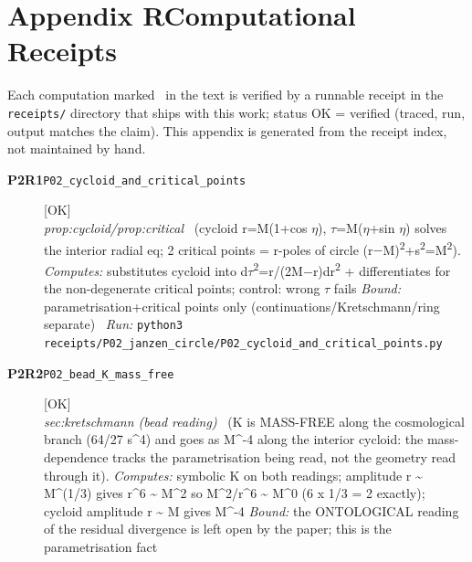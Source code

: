 \clearpage
\section*{Appendix R\quad Computational Receipts}\label{app:receipts}
\small\noindent Each computation marked \rcptmarker\ in the text is verified by a runnable receipt in the \texttt{receipts/} directory that ships with this work; status \textsf{OK} = verified (traced, run, output matches the claim). This appendix is generated from the receipt index, not maintained by hand.\par\medskip
\begingroup\renewcommand{\arraystretch}{1.25}
\begin{description}
\item[\textbf{P2R1}\quad\texttt{P02\_cycloid\_and\_critical\_points}]\hfill\textsf{[OK]}\\
\textit{prop:cycloid/prop:critical} \ (cycloid r=M(1+cos \ensuremath{\eta}), \ensuremath{\tau}=M(\ensuremath{\eta}+sin \ensuremath{\eta}) solves the interior radial eq; 2 critical points = r-poles of circle (r\ensuremath{-}M)\textsuperscript{2}+s\textsuperscript{2}=M\textsuperscript{2}). 
\emph{Computes:} substitutes cycloid into d\ensuremath{\tau}\textsuperscript{2}=r/(2M\ensuremath{-}r)dr\textsuperscript{2} + differentiates for the non-degenerate critical points; control: wrong \ensuremath{\tau} fails
 \emph{Bound:} parametrisation+critical points only (continuations/Kretschmann/ring separate)
\ \emph{Run:} \texttt{python3 receipts/P02\_janzen\_circle/P02\_cycloid\_and\_critical\_points.py}
\item[\textbf{P2R2}\quad\texttt{P02\_bead\_K\_mass\_free}]\hfill\textsf{[OK]}\\
\textit{sec:kretschmann (bead reading)} \ (K is MASS-FREE along the cosmological branch (64/27 s\textasciicircum{}4) and goes as M\textasciicircum{}-4 along the interior cycloid: the mass-dependence tracks the parametrisation being read, not the geometry read through it). 
\emph{Computes:} symbolic K on both readings; amplitude r \textasciitilde{} M\textasciicircum{}(1/3) gives r\textasciicircum{}6 \textasciitilde{} M\textasciicircum{}2 so M\textasciicircum{}2/r\textasciicircum{}6 \textasciitilde{} M\textasciicircum{}0 (6 x 1/3 = 2 exactly); cycloid amplitude r \textasciitilde{} M gives M\textasciicircum{}-4
 \emph{Bound:} the ONTOLOGICAL reading of the residual divergence is left open by the paper; this is the parametrisation fact

\end{description}
